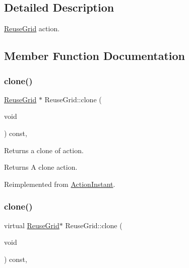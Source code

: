 \subsection{Detailed Description}
\hyperlink{classReuseGrid}{Reuse\+Grid} action. 

\subsection{Member Function Documentation}
\mbox{\label{classReuseGrid_ac673b0ea0d616453756f40c4d04943ca}} 
\subsubsection{\texorpdfstring{clone()}{clone()}\hspace{0.1cm}{\footnotesize\ttfamily [1/2]}}
{\footnotesize\ttfamily \hyperlink{classReuseGrid}{Reuse\+Grid} $\ast$ Reuse\+Grid\+::clone (\begin{DoxyParamCaption}\item[{void}]{ }\end{DoxyParamCaption}) const\hspace{0.3cm}{\ttfamily [override]}, {\ttfamily [virtual]}}

Returns a clone of action.

\begin{DoxyReturn}{Returns}
A clone action. 
\end{DoxyReturn}


Reimplemented from \hyperlink{classActionInstant_adb76fc6f006098109e8256210cbd8cc0}{Action\+Instant}.

\mbox{\label{classReuseGrid_a8a2953d1479f6753fa7b6c82864c5781}} 
\subsubsection{\texorpdfstring{clone()}{clone()}\hspace{0.1cm}{\footnotesize\ttfamily [2/2]}}
{\footnotesize\ttfamily virtual \hyperlink{classReuseGrid}{Reuse\+Grid}$\ast$ Reuse\+Grid\+::clone (\begin{DoxyParamCaption}\item[{void}]{ }\end{DoxyParamCaption}) const\hspace{0.3cm}{\ttfamily [override]}, {\ttfamily [virtual]}}

